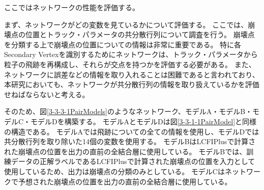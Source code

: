 ここではネットワークの性能を評価する。

まず、ネットワークがどの変数を見ているかについて評価する。
ここでは、崩壊点の位置とトラック・パラメータの共分散行列について調査を行う。
崩壊点を分類する上で崩壊点の位置についての情報は非常に重要である。
特に各Secondary Vertexを識別するためにネットワークは、トラック・パラメータから粒子の飛跡を再構成し、それらが交点を持つかを評価する必要がある。
また、ネットワークに誤差などの情報を取り入れることは困難であると言われており、本研究においても、ネットワークが共分散行列の情報を取り扱えているかを評価せねばならないと考える。

そのため、図\ref{3-3-3-1PairModels}のようなネットワーク、モデルA・モデルB・モデルC・モデルDを構築する。
モデルAとモデルDは図\ref{3-3-1-1PairModel}と同様の構造である。
モデルAでは飛跡についての全ての情報を使用し、モデルDでは共分散行列を取り除いた14個の変数を使用する。
モデルBはLCFIPlusで計算された崩壊点の位置を出力の直前の全結合層に使用している。
モデルBでは、訓練データの正解ラベルであるLCFIPlusで計算された崩壊点の位置を入力として使用しているため、出力は崩壊点の分類のみとしている。
モデルCはネットワークで予想された崩壊点の位置を出力の直前の全結合層に使用している。

